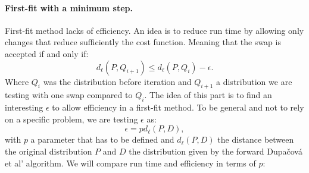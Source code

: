 \documentclass{amsart}
\begin{document}
\paragraph{\textbf{First-fit with a minimum step.}}\label{step}
First-fit method lacks of efficiency. An idea is to reduce run time by allowing only changes that reduce sufficiently the cost function. Meaning that the swap is accepted if and only if: $$
d_\ell\left(P,Q_{i+1}\right) \leq d_\ell\left(P,Q_i\right) - \epsilon.
$$
Where $Q_i$ was the distribution before iteration and $Q_{i+1}$ a distribution we are testing with one swap compared to $Q_i$. The idea of this part is to find an interesting $\epsilon$ to allow efficiency in a first-fit method. To be general and not to rely on a specific problem, we are testing $\epsilon$ as: $$\epsilon=pd_\ell\left(P,D\right),$$ with $p$ a parameter that has to be defined and $d_\ell\left(P,D\right)$ the distance between the original distribution $P$ and $D$ the distribution given by the forward Dupačová et al' algorithm. We will compare run time and efficiency in terms of $p$:
\end{document}

